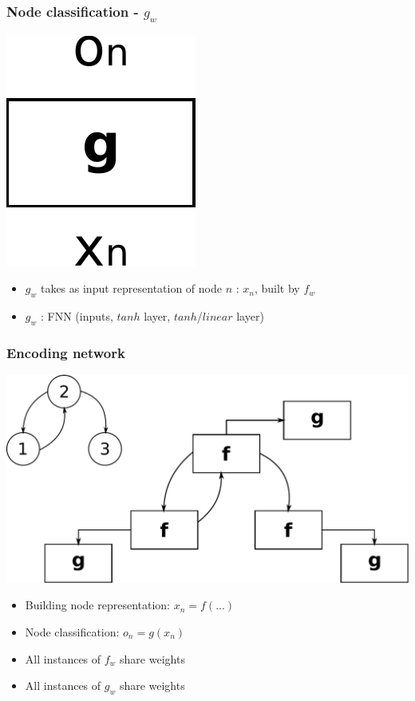 \documentclass{beamer}
\begin{document}
\begin{frame}
\frametitle{Node classification - $g_w$}
\begin{center}
\includegraphics[scale=0.4]{img/g}
\end{center}
\begin{itemize}
	\item $g_w$ takes as input representation of node $n$ : $x_n$, built by $f_w$
	\item $g_w$ : FNN (inputs, $tanh$ layer, $tanh$/$linear$ layer)
\end{itemize}
\end{frame}

\begin{frame}
\frametitle{Encoding network}
\begin{center}
	\includegraphics[scale=0.4]{img/encodinginc}
\end{center}
\begin{itemize}
	\item Building node representation: $x_n = f(...)$
	\item Node classification: $o_n = g(x_n)$
	\item All instances of $f_w$ share weights
	\item All instances of $g_w$ share weights
\end{itemize}
\end{frame}
\end{document}
